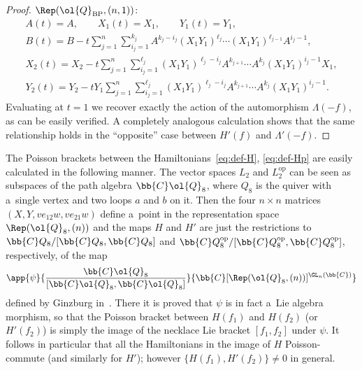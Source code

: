 \begin{proof}
\(\Rep(\ol{Q}_{\mathrm{BP}},(n,1))\):
\begin{gather*}
A(t)=A,
\qquad
X_{1}(t)=X_{1},
\qquad
Y_{1}(t)=Y_{1},
\\
B(t)=B-t\sum_{j=1}^{n}\sum_{i_{j}=1}^{k_{j}}A^{k_{j}-i_{j}}(X_{1}Y_{1})^{\ell_{j}}\cdots(X_{1}Y_{1}
)^{\ell_{j-1}}A^{i_{j}-1},
\\
X_{2}(t)=X_{2}-t\sum_{j=1}^{n}\sum_{i_{j}=1}^{\ell_{j}}(X_{1}Y_{1})^{\ell_{j}-i_{j}}A^{k_{j+1}}
\cdots A^{k_{j}}(X_{1}Y_{1})^{i_{j}-1}X_{1},
\\
Y_{2}(t)=Y_{2}-t Y_{1}\sum_{j=1}^{n}\sum_{i_{j}=1}^{\ell_{j}}(X_{1}Y_{1})^{\ell_{j}-i_{j}}A^{k_{j+1}}
\cdots A^{k_{j}}(X_{1}Y_{1})^{i_{j}-1}.
\end{gather*}
Evaluating at \(t=1\) we recover exactly the action of the automorphism \(\Lambda(-f)\), as can be easily
verif\/ied.
A completely analogous calculation shows that the same relationship holds in the ``opposite'' case between
\(H'(f)\) and \(\Lambda'(-f)\).
\end{proof}

\begin{remark}
The Poisson brackets between the Hamiltonians~\eqref{eq:def-H}, \eqref{eq:def-Hp} are easily calculated in
the following manner.
The vector spaces \(L_{2}\) and \(L_{2}^{\mathrm{op}}\) can be seen as subspaces of the path algebra
\(\bb{C}\ol{Q}_{8}\), where \(Q_{8}\) is the quiver with a~single vertex and two loops \(a\) and \(b\) on
it.
Then the four \(n\times n\) matrices \((X, Y, ve_{12}w, ve_{21}w)\) def\/ine a~point in the representation
space \(\Rep(\ol{Q}_{8},(n))\) and the maps \(H\) and \(H'\) are just the restrictions to
\(\bb{C}Q_{8}/[\bb{C}Q_{8}, \bb{C}Q_{8}]\) and \(\bb{C}Q_{8}^{\mathrm{op}}/[\bb{C}Q_{8}^{\mathrm{op}},
\bb{C}Q_{8}^{\mathrm{op}}]\), respectively, of the map
\begin{gather*}
\app{\psi}{\frac{\bb{C}\ol{Q}_{8}}{[\bb{C}\ol{Q}_{8},\bb{C}\ol{Q}_{8}]}}{\bb{C}[\Rep(\ol{Q}_{8}
,(n))]^{\GL_{n}(\bb{C})}}
\end{gather*}
def\/ined by Ginzburg in~\cite{ginz01}.
There it is proved that \(\psi\) is in fact a~Lie algebra morphism, so that the Poisson bracket between
\(H(f_{1})\) and \(H(f_{2})\) (or \(H'(f_{2})\)) is simply the image of the necklace Lie bracket
\([f_{1},f_{2}]\) under \(\psi\).
It follows in particular that all the Hamiltonians in the image of \(H\) Poisson-commute (and similarly for
\(H'\)); however \(\{H(f_{1}),H'(f_{2})\}\neq 0\) in general.
\end{remark}

